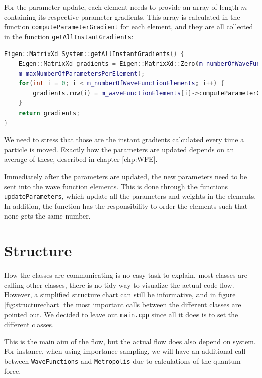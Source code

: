 For the parameter update, each element needs to provide an array of length $m$ containing its respective parameter gradients. This array is calculated in the function \newline \texttt{computeParameterGradient} for each element, and they are all collected in the function \texttt{getAllInstantGradients}:

\lstset{basicstyle=\scriptsize}
\begin{lstlisting}[language=c++,caption={from \texttt{system.cpp}}]
Eigen::MatrixXd System::getAllInstantGradients() {
    Eigen::MatrixXd gradients = Eigen::MatrixXd::Zero(m_numberOfWaveFunctionElements, \
    m_maxNumberOfParametersPerElement);
    for(int i = 0; i < m_numberOfWaveFunctionElements; i++) {
        gradients.row(i) = m_waveFunctionElements[i]->computeParameterGradient();
    }
    return gradients;
}
\end{lstlisting}
We need to stress that those are the instant gradients calculated every time a particle is moved. Exactly how the parameters are updated depends on an average of these, described in chapter \ref{chp:WFE}. 

Immediately after the parameters are updated, the new parameters need to be sent into the wave function elements. This is done through the functions \texttt{updateParameters}, which update all the parameters and weights in the elements. In addition, the function has the responsibility to order the elements such that none gets the same number. 


\section{Structure} \label{subsec:structure}
How the classes are communicating is no easy task to explain, most classes are calling other classes, there is no tidy way to visualize the actual code flow. However, a simplified structure chart can still be informative, and in figure \eqref{fig:structurechart} the most important calls between the different classes are pointed out. We decided to leave out \texttt{main.cpp} since all it does is to set the different classes. 



This is the main aim of the flow, but the actual flow does also depend on system. For instance, when using importance sampling, we will have an additional call between \texttt{WaveFunctions} and \texttt{Metropolis} due to calculations of the quantum force. 

